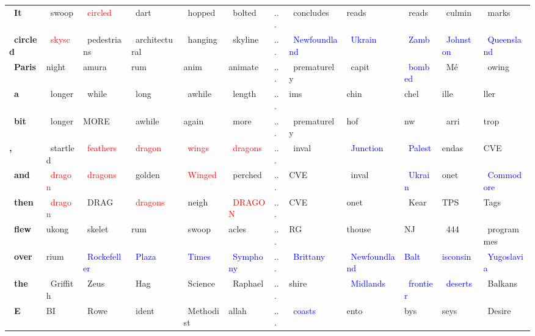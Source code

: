 \documentclass{article}
\begin{document}
\begin{table}
{\begin{tabular}{llllllllllll}
    \textbf{\ It} & \ swoop & \textcolor{red}{\ circled} & \ dart & \ hopped & \ bolted & ... & \ concludes & reads & \ reads & \ culmin & \ marks \\
    \textbf{\ circled} & \textcolor{red}{\ skysc} & \ pedestrians & \ architectural & \ hanging & \ skyline & ... & \textcolor{blue}{\ Newfoundland} & \textcolor{blue}{\ Ukrain} & \textcolor{blue}{\ Zamb} & \textcolor{blue}{\ Johnston} & \textcolor{blue}{\ Queensland} \\
    \textbf{\ Paris} & night & amura & rum & anim & animate & ... & \ prematurely & \ capit & \textcolor{blue}{\ bombed} & \ Mé & \ owing \\
    \textbf{\ a} & \ longer & \ while & \ long & \ awhile & \ length & ... & ims & chin & chel & ille & ller \\
    \textbf{\ bit} & \ longer & MORE & \ awhile & again & \ more & ... & \ prematurely & hof & nw & \ arri & trop \\
    \textbf{,} & \ startled & \textcolor{red}{\ feathers} & \textcolor{red}{\ dragon} & \textcolor{red}{\ wings} & \textcolor{red}{\ dragons} & ... & \ inval & \ \textcolor{blue}{Junction} & \ \textcolor{blue}{Palest} & endas & CVE \\
    \textbf{\ and} & \textcolor{red}{\ dragon} & \textcolor{red}{\ dragons} & \ golden & \textcolor{red}{\ Winged} & \ perched & ... & CVE & \ inval & \ \textcolor{blue}{Ukrain} & onet & \ \textcolor{blue}{Commodore} \\
    \textbf{\ then} & \textcolor{red}{\ dragon} & \ DRAG & \ \textcolor{red}{dragons} & \ neigh & \ \textcolor{red}{DRAGON} & ... & CVE & onet & \ Kear & TPS & Tags \\
    \textbf{\ flew} & ukong & \ skelet & rum & \ swoop & acles & ... & RG & thouse & NJ & \ 444 & \ programmes \\
    \textbf{\ over} & rium & \textcolor{blue}{\ Rockefeller} & \textcolor{blue}{\ Plaza} & \textcolor{blue}{\ Times} & \textcolor{blue}{\ Symphony} & ... & \ \textcolor{blue}{Brittany} & \ \textcolor{blue}{Newfoundland} & \textcolor{blue}{Balt} & \textcolor{blue}{isconsin} & \ \textcolor{blue}{Yugoslavia} \\
    \textbf{\ the} & \ Griffith & \ Zeus & \ Hag & \ Science & \ Raphael & ... & shire & \ \textcolor{blue}{Midlands} & \ \textcolor{blue}{frontier} & \ \textcolor{blue}{deserts} & \ Balkans \\
    \textbf{\ E} & BI & \ Rowe & \ ident & \ Methodist & allah & ... & \ \textcolor{blue}{coasts} & ento & bys & seys & \ Desire \\

\end{tabular}}
\end{table}
\end{document}
